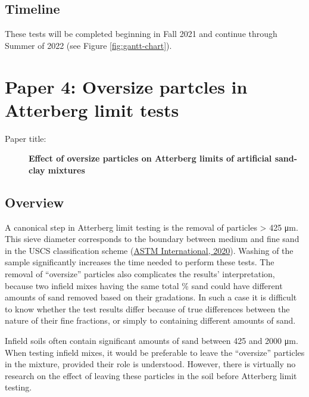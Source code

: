 \documentclass[
  letterpaper,
  openany]{book}
\begin{document}
\hypertarget{timeline-2}{%
\subsection{Timeline}\label{timeline-2}}

These tests will be completed beginning in Fall 2021 and continue through Summer of 2022 (see Figure \ref{fig:gantt-chart}).

\newpage

\hypertarget{oversize-particles-atterberg-limits-experiment}{%
\section{Paper 4: Oversize partcles in Atterberg limit tests}\label{oversize-particles-atterberg-limits-experiment}}

\begin{description}
\item[Paper title:]
\textbf{Effect of oversize particles on Atterberg limits of artificial sand-clay mixtures }
\end{description}

\hypertarget{overview-3}{%
\subsection{Overview}\label{overview-3}}

A canonical step in Atterberg limit testing is the removal of particles \textgreater{} 425 μm.
This sieve diameter corresponds to the boundary between medium and fine sand in the USCS classification scheme (\protect\hyperlink{ref-ASTMD2487-17}{ASTM International, 2020}).
Washing of the sample significantly increases the time needed to perform these tests.
The removal of ``oversize'' particles also complicates the results' interpretation, because two infield mixes having the same total \% sand could have different amounts of sand removed based on their gradations.
In such a case it is difficult to know whether the test results differ because of true differences between the nature of their fine fractions, or simply to containing different amounts of sand.

Infield soils often contain significant amounts of sand between 425 and 2000 μm.
When testing infield mixes, it would be preferable to leave the ``oversize'' particles in the mixture, provided their role is understood.
However, there is virtually no research on the effect of leaving these particles in the soil before Atterberg limit testing.
\end{document}
